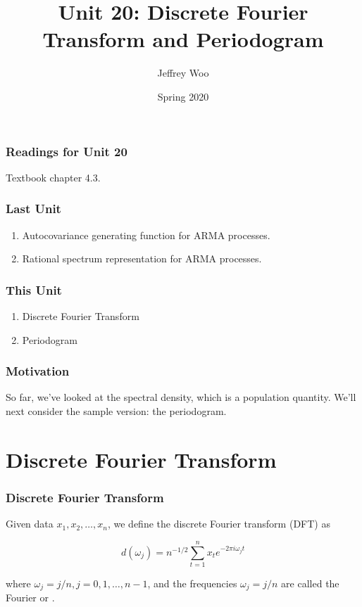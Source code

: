 \documentclass[%
xcolor=pdftex]{beamer}
\title{Unit 20: Discrete Fourier Transform and Periodogram}
\author[STAT 5170: Applied Time Series, Unit 20]{Jeffrey Woo}
\institute{Department of Statistics, University of Virginia}
\date{Spring 2020}  %
\begin{document}
\frame{\titlepage}


\begin{frame}
\frametitle{Readings for Unit 20}

Textbook chapter 4.3.

\end{frame}



\begin{frame}
\frametitle{Last Unit}
\begin{enumerate}
\item Autocovariance generating function for ARMA processes.
\item Rational spectrum representation for ARMA processes.
\end{enumerate}
\end{frame}

\begin{frame}
\frametitle{This Unit}
\begin{enumerate}
\item Discrete Fourier Transform
\item Periodogram
\end{enumerate}
\end{frame}

\begin{frame}
\frametitle{Motivation}

So far, we've looked at the spectral density, which is a population quantity. We'll next consider the sample version: the periodogram.

\end{frame}

\section{Discrete Fourier Transform}
\frame{\tableofcontents[currentsection]}

\begin{frame}
\frametitle{Discrete Fourier Transform}

Given data $x_1,x_2,\ldots,x_n$, we define
the discrete Fourier transform (DFT) as

\begin{equation} \label{eq:DFT}
d(\omega_j)=n^{-1/2} \sum_{t=1}^n x_t e^{-2 \pi i \omega_j t}
\end{equation}

where $\omega_j= j/n, j=0,1,\ldots,n-1$, and the frequencies $\omega_j = j/n$ are called the Fourier or \underline{\hspace{40 mm}}.
\end{frame}
\end{document}

